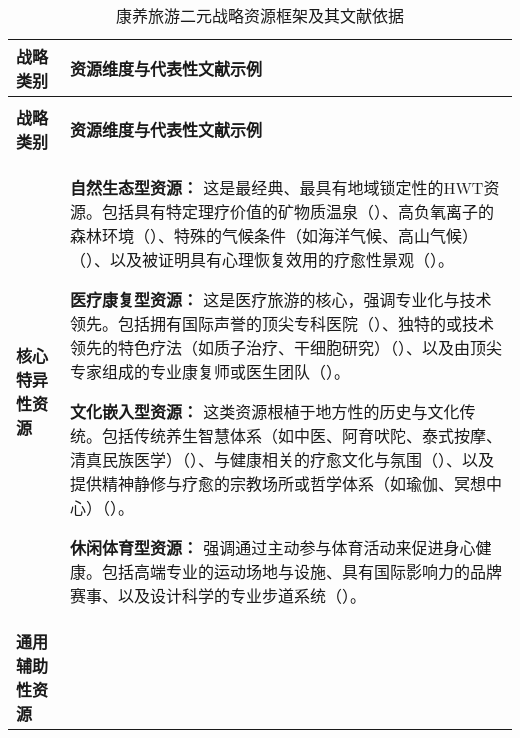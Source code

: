 \documentclass[UTF8, 12pt, a4paper, twoside]{ctexart}
\begin{document}
\begin{longtable}{>{\bfseries}p{} >{\raggedright\arraybackslash}p{}}
	\caption{康养旅游二元战略资源框架及其文献依据}
	\label{tab:binary_framework}                  \\
	\toprule
	\textbf{战略类别} & \textbf{资源维度与代表性文献示例}         \\
	\midrule
	\endfirsthead
	\multicolumn{2}{c}{\tablename~\thetable\ (续)} \\
	\toprule
	\textbf{战略类别} & \textbf{资源维度与代表性文献示例}         \\
	\midrule
	\endhead
	\bottomrule
	\endfoot
	\addlinespace
	核心特异性资源       &
	\begin{tabitemize}
		\item \textbf{自然生态型资源：} 这是最经典、最具有地域锁定性的HWT资源。包括具有特定理疗价值的矿物质温泉（\parencite{chen2013investigating, mi2019evaluating, heung2013wellness}）、高负氧离子的森林环境（\parencite{soroka2016importance, li2025from, zhang2025sustainable}）、特殊的气候条件（如海洋气候、高山气候）（\parencite{schmude2021geography, aminia2020investigation}）、以及被证明具有心理恢复效用的疗愈性景观（\parencite{jeong2020sustaining, huang2018therapeutic}）。
		\item \textbf{医疗康复型资源：} 这是医疗旅游的核心，强调专业化与技术领先。包括拥有国际声誉的顶尖专科医院（\parencite{ganguli2017qualitative, connell2006medical}）、独特的或技术领先的特色疗法（如质子治疗、干细胞研究）（\parencite{he2015traditional, bowman2015responsibilities}）、以及由顶尖专家组成的专业康复师或医生团队（\parencite{vrkljan2017business, qadeer2013medical}）。
		\item \textbf{文化嵌入型资源：} 这类资源根植于地方性的历史与文化传统。包括传统养生智慧体系（如中医、阿育吠陀、泰式按摩、清真民族医学）（\parencite{kaspar2023odysseys, romao2022stakeholder, moriuchi2024strategies,kurniawanHalalEthnomedicineHealth2025}）、与健康相关的疗愈文化与氛围（\parencite{choe2020faith}）、以及提供精神静修与疗愈的宗教场所或哲学体系（如瑜伽、冥想中心）（\parencite{norman2017meditation, kato2017spiritual, yun2024engaged}）。
		\item \textbf{休闲体育型资源：} 强调通过主动参与体育活动来促进身心健康。包括高端专业的运动场地与设施、具有国际影响力的品牌赛事、以及设计科学的专业步道系统（\parencite{hanna2019active, araujo-vila2020health, szromek2022health}）。
	\end{tabitemize}
	\\
	\addlinespace
	通用辅助性资源       &
	\begin{tabitemize}

\end{tabitemize}
\end{longtable}
\end{document}
